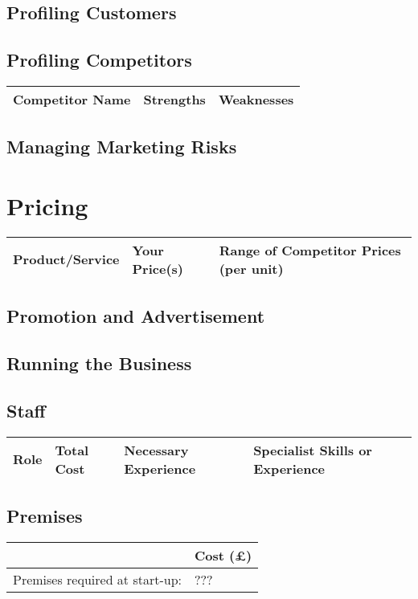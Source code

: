\documentclass[DIV=calc, paper=a4, fontsize=11pt]{scrartcl}	 %
\begin{document}
\subsection{Profiling Customers}

\subsection{Profiling Competitors}
\begin{tabular}{|l|l|l|} \hline
Competitor Name & Strengths & Weaknesses \\ \hline
\end{tabular}

\subsection{Managing Marketing Risks}

\section{Pricing}

\begin{tabular}{|l|l|l|} \hline
Product/Service & Your Price(s) & Range of Competitor Prices (per unit) \\ \hline
\end{tabular}

\subsection{Promotion and Advertisement}

\subsection{Running the Business}

\subsection{Staff}
\begin{tabular}{|l|l|l|l|}\hline
Role & Total Cost & Necessary Experience & Specialist Skills or Experience \\ \hline
\end{tabular}

\subsection{Premises}
\begin{tabular}{|l|l|} \hline
                               & Cost (\pounds) \\ \hline
Premises required at start-up: & ???            \\ \hline
\end{tabular}
\end{document}

